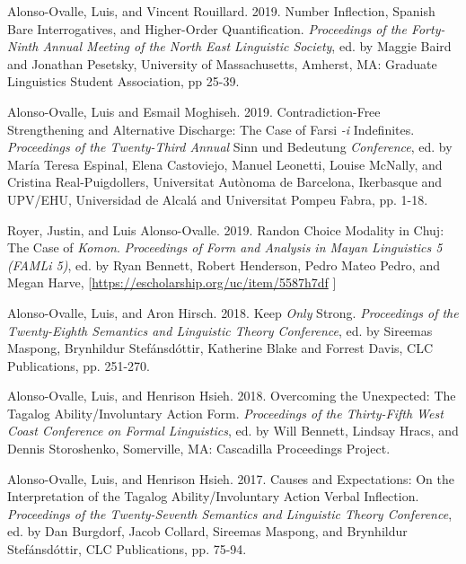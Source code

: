 \documentclass[11pt]{article}
\begin{document}
Alonso-Ovalle, Luis, and Vincent Rouillard. 2019. Number Inflection, Spanish Bare Interrogatives, and Higher-Order Quantification. \textit{Proceedings
of the Forty-Ninth Annual Meeting of the North East Linguistic Society}, ed. by Maggie Baird and Jonathan Pesetsky, University of Massachusetts, Amherst, MA: Graduate Linguistics Student Association, pp 25-39.
 
 Alonso-Ovalle, Luis and Esmail Moghiseh. 2019. Contradiction-Free Strengthening and Alternative Discharge: The Case of Farsi \textit{-i} Indefinites. \textit{Proceedings of the Twenty-Third Annual} Sinn und Bedeutung \textit{Conference}, ed. by Mar\'ia Teresa Espinal, Elena Castoviejo, Manuel Leonetti, Louise McNally, and Cristina Real-Puigdollers, Universitat Aut\`onoma de Barcelona, Ikerbasque and UPV/EHU, Universidad de Alcal\'a and Universitat Pompeu Fabra, pp. 1-18. %
      
 Royer, Justin, and Luis Alonso-Ovalle. 2019. Randon Choice Modality in Chuj: The Case of \textit{Komon}. \textit{Proceedings of Form and Analysis in Mayan Linguistics 5 (FAMLi 5)}, ed. by Ryan Bennett, Robert Henderson, Pedro Mateo Pedro, and Megan Harve, {\footnotesize [\href{https://escholarship.org/uc/item/5587h7df}{https://escholarship.org/uc/item/5587h7df} ]}
      
Alonso-Ovalle, Luis, and Aron Hirsch. 2018. Keep \textit{Only} Strong. \textit{Proceedings of the Twenty-Eighth Semantics and Linguistic Theory Conference}, ed. by Sireemas Maspong, Brynhildur Stef\'ansd\'ottir, Katherine Blake and Forrest Davis, CLC Publications, pp. 251-270. %
       
 Alonso-Ovalle, Luis, and Henrison Hsieh. 2018. Overcoming the Unexpected: The Tagalog Ability/Involuntary Action Form.  \textit{Proceedings of the Thirty-Fifth West Coast Conference on Formal Linguistics}, ed. by Will Bennett, Lindsay Hracs, and Dennis Storoshenko, Somerville, MA: Cascadilla Proceedings Project.      
      
 Alonso-Ovalle, Luis, and Henrison Hsieh. 2017. Causes and Expectations: On the Interpretation of the Tagalog Ability/Involuntary Action Verbal Inflection. \textit{Proceedings of the Twenty-Seventh Semantics and Linguistic Theory Conference}, ed. by Dan Burgdorf, Jacob Collard, Sireemas Maspong, and Brynhildur Stef\'ansd\'ottir, CLC Publications, pp. 75-94. %
\end{document}
